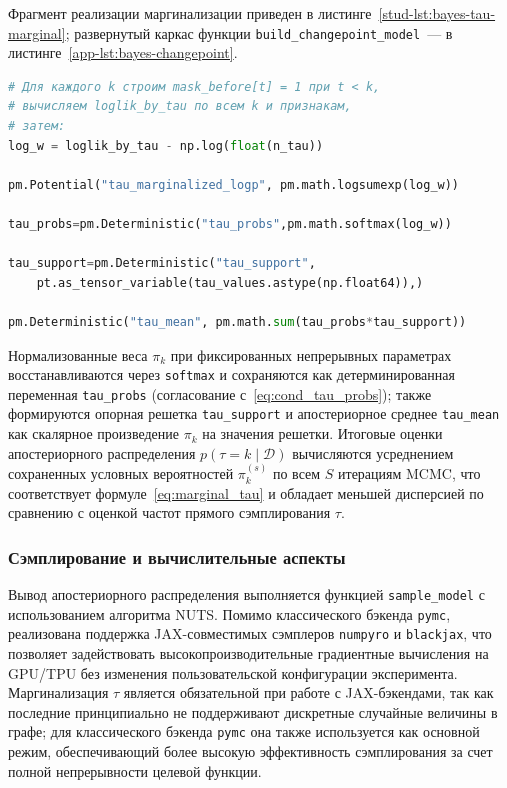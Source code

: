 \documentclass[14pt]{mmcs_article}
\begin{document}
Фрагмент реализации маргинализации приведен в
листинге~\ref{stud-lst:bayes-tau-marginal}; развернутый
каркас функции \texttt{build\_changepoint\_model}~--- в
листинге~\ref{app-lst:bayes-changepoint}.

\begin{lstlisting}[language=Python, caption={Маргинализация $\tau$: потенциал с \texttt{logsumexp} и восстановление вероятностей на решетке}, label=stud-lst:bayes-tau-marginal]
# Для каждого k строим mask_before[t] = 1 при t < k,
# вычисляем loglik_by_tau по всем k и признакам,
# затем:
log_w = loglik_by_tau - np.log(float(n_tau))

pm.Potential("tau_marginalized_logp", pm.math.logsumexp(log_w))

tau_probs=pm.Deterministic("tau_probs",pm.math.softmax(log_w))

tau_support=pm.Deterministic("tau_support", 
	pt.as_tensor_variable(tau_values.astype(np.float64)),)

pm.Deterministic("tau_mean", pm.math.sum(tau_probs*tau_support))
\end{lstlisting}

Нормализованные веса $\pi_k$ при фиксированных непрерывных
параметрах восстанавливаются через \texttt{softmax} и
сохраняются как детерминированная переменная
\texttt{tau\_probs} (согласование с~\eqref{eq:cond_tau_probs});
также формируются опорная решетка \texttt{tau\_support} и
апостериорное среднее \texttt{tau\_mean} как скалярное
произведение $\pi_k$ на значения решетки. Итоговые оценки
апостериорного распределения $p(\tau = k \mid \mathcal{D})$
вычисляются усреднением сохраненных условных вероятностей
$\pi_k^{(s)}$ по всем $S$ итерациям MCMC, что соответствует
формуле~\eqref{eq:marginal_tau} и обладает меньшей дисперсией
по сравнению с оценкой частот прямого сэмплирования $\tau$.

\subsubsection*{Сэмплирование и вычислительные аспекты}

Вывод апостериорного распределения  выполняется функцией\linebreak
\texttt{sample\_model} с использованием алгоритма NUTS.
Помимо классического бэкенда \texttt{pymc}, реализована
поддержка JAX-совместимых сэмплеров \texttt{numpyro} и
\texttt{blackjax}, что позволяет задействовать
высокопроизводительные градиентные вычисления на GPU/TPU
без изменения пользовательской конфигурации эксперимента.
Маргинализация $\tau$ является обязательной при работе с
JAX-бэкендами, так как последние принципиально не
поддерживают дискретные случайные величины в графе; для
классического бэкенда \texttt{pymc} она также используется
как основной режим, обеспечивающий более высокую
эффективность сэмплирования за счет полной непрерывности
целевой функции.
\end{document}

